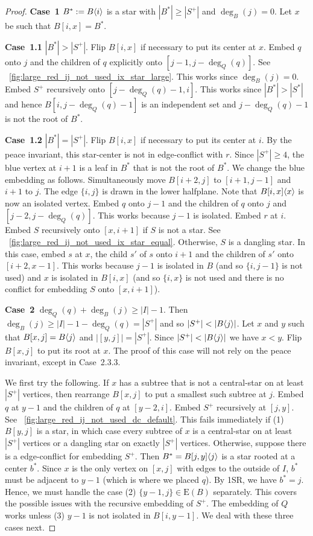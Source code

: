 \documentclass[11pt,a4paper,colorlinks=true,urlcolor=blue,citecolor=red]{article}
\theoremstyle{plain}
\newcommand{\case}[1]{\par\vspace{.5\baselineskip}\noindent\textbf{\sffamily Case~#1}}
\newcommand{\EB}{\mathrm{E}(B)}
\begin{document}
\begin{proof}
  \case{1} $B^*:=B\langle{i}\rangle$ is a star with $|B^*|\geq|S^+|$ and
  $\deg_B(j)=0$. Let $x$ be such that $B[i,x]=B^*$.

  \case{1.1} $|B^*|>|S^+|$. Flip $B[i,x]$ if necessary to put its
  center at $x$. Embed $q$ onto $j$ and the children of $q$ explicitly
  onto $[j-1,j-\deg_Q(q)]$. See
  \figurename~\ref{fig:large_red_ij_not_used_ix_star_large}. This works
  since $\deg_B(j)=0$. Embed $S^+$ recursively onto $[j-\deg_Q(q)-1,i]$.
  This works since $|B^*|>|S^*|$ and hence $B[i,j-\deg_Q(q)-1]$ is an
  independent set and $j-\deg_Q(q)-1$ is not the root of $B^*$.

  \case{1.2} $|B^*|=|S^+|$. Flip $B[i,x]$ if necessary to put its center
  at $i$. By the peace invariant, this star-center is not in
  edge-conflict with $r$. Since $|S^+|\geq 4$, the blue vertex at $i+1$
  is a leaf in $B^*$ that is not the root of $B^*$. We change the blue
  embedding as follows. Simultaneously move $B[i+2,j]$ to $[i+1,j-1]$
  and $i+1$ to $j$. The edge $\{i,j\}$ is drawn in the lower
  halfplane. Note that $B{[i,x]}\langle{x}\rangle$ is now an isolated vertex.
  Embed $q$ onto $j-1$ and the children of $q$ onto $j$ and
  $[j-2,j-\deg_Q(q)]$. This works because $j-1$ is isolated. Embed $r$
  at $i$. Embed $S$ recursively onto $[x,i+1]$ if $S$ is not a star. See
  \figurename~\ref{fig:large_red_ij_not_used_ix_star_equal}. Otherwise,
  $S$ is a dangling star. In this case, embed $s$ at $x$, the child $s'$
  of $s$ onto $i+1$ and the children of $s'$ onto $[i+2,x-1]$. This
  works because $j-1$ is isolated in $B$ (and so $\{i,j-1\}$ is not
  used) and $x$ is isolated in $B[i,x]$ (and so $\{i,x\}$ is not used
  and there is no conflict for embedding $S$ onto $[x,i+1]$).

  \case{2} $\deg_Q(q)+\deg_B(j)\geq|I|-1$. Then
  $\deg_B(j)\geq|I|-1-\deg_Q(q)=|S^+|$ and so $|S^+|<|\treeat{j}|$. Let
  $x$ and $y$ such that $B[x,j]=B\langle{j}\rangle$ and $|[y,j]|=|S^+|$. Since
  $|S^+|<|\treeat{j}|$ we have $x<y$. Flip $B[x,j]$ to put its root at
  $x$. The proof of this case will not rely on the peace invariant,
  except in Case~2.3.3.

  We first try the following. If $x$ has a subtree that is not a
  central-star on at least $|S^+|$ vertices, then rearrange $B[x,j]$ to
  put a smallest such subtree at $j$. Embed $q$ at $y-1$ and the
  children of $q$ at $[y-2,i]$. Embed $S^+$ recursively at $[j,y]$. See
  \figurename~\ref{fig:large_red_ij_not_used_dc_default}. This fails
  immediately if (1) $B[y,j]$ is a star, in which case every subtree of
  $x$ is a central-star on at least $|S^+|$ vertices or a dangling star
  on exactly $|S^+|$ vertices. Otherwise, suppose there is a
  edge-conflict for embedding $S^+$. Then $B^*=B{[j,y]}\langle{j}\rangle$
  is a star rooted at a center $b^*$. Since $x$ is the only vertex on
  $[x,j]$ with edges to the outside of $I$, $b^*$ must be adjacent to
  $y-1$ (which is where we placed $q$). By 1SR, we have $b^*=j$. Hence,
  we must handle the case (2) $\{y-1,j\}\in\EB$ separately.
  This covers the possible issues with the recursive embedding of $S^+$.
  The embedding of $Q$ works unless (3) $y-1$ is not isolated in
  $B[i,y-1]$. We deal with these three cases next.


\end{proof}
\end{document}
